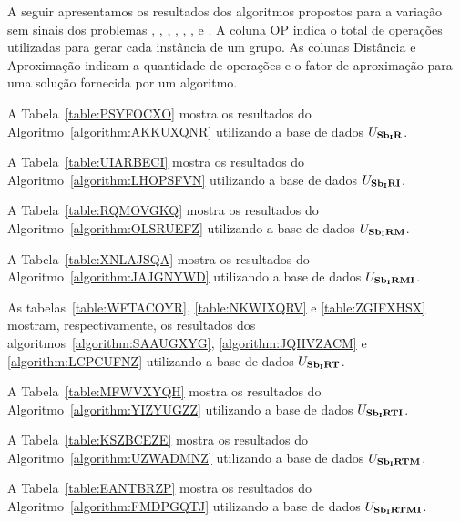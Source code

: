 A seguir apresentamos os resultados dos algoritmos propostos para a variação sem sinais dos problemas \SbIR{}, \SbIRI{}, \SbIRM{}, \SbIRMI{}, \SbIRT{}, \SbIRTI{}, \SbIRTM{} e \SbIRTMI{}. A coluna OP indica o total de operações utilizadas para gerar cada instância de um grupo. As colunas Distância e Aproximação indicam a quantidade de operações e o fator de aproximação para uma solução fornecida por um algoritmo.

A Tabela~\ref{table:PSYFOCXO} mostra os resultados do Algoritmo~\ref{algorithm:AKKUXQNR} utilizando a base de dados $U_{\textbf{Sb\textsubscript{I}R}}{}$.



A Tabela~\ref{table:UIARBECI} mostra os resultados do Algoritmo~\ref{algorithm:LHOPSFVN} utilizando a base de dados $U_{\textbf{Sb\textsubscript{I}RI}}{}$.



A Tabela~\ref{table:RQMOVGKQ} mostra os resultados do Algoritmo~\ref{algorithm:OLSRUEFZ} utilizando a base de dados $U_{\textbf{Sb\textsubscript{I}RM}}{}$.



A Tabela~\ref{table:XNLAJSQA} mostra os resultados do Algoritmo~\ref{algorithm:JAJGNYWD} utilizando a base de dados $U_{\textbf{Sb\textsubscript{I}RMI}}{}$.



As tabelas~\ref{table:WFTACOYR}, \ref{table:NKWIXQRV} e \ref{table:ZGIFXHSX} mostram, respectivamente, os resultados dos algoritmos~\ref{algorithm:SAAUGXYG}, \ref{algorithm:JQHVZACM} e \ref{algorithm:LCPCUFNZ} utilizando a base de dados $U_{\textbf{Sb\textsubscript{I}RT}}{}$.







A Tabela~\ref{table:MFWVXYQH} mostra os resultados do Algoritmo~\ref{algorithm:YIZYUGZZ} utilizando a base de dados $U_{\textbf{Sb\textsubscript{I}RTI}}{}$.



A Tabela~\ref{table:KSZBCEZE} mostra os resultados do Algoritmo~\ref{algorithm:UZWADMNZ} utilizando a base de dados $U_{\textbf{Sb\textsubscript{I}RTM}}{}$.



A Tabela~\ref{table:EANTBRZP} mostra os resultados do Algoritmo~\ref{algorithm:FMDPGQTJ} utilizando a base de dados $U_{\textbf{Sb\textsubscript{I}RTMI}}{}$.



